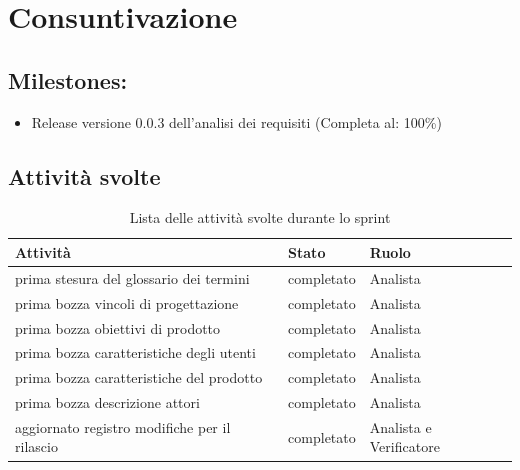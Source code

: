 \section{Consuntivazione}

\subsection{Milestones:}
\begin{itemize}
    \item Release versione 0.0.3 dell'analisi dei requisiti (Completa al: 100\%)
\end{itemize}

\subsection{Attività svolte}


\begin{table}[ht]
    \begin{tabularx}{\textwidth}{X l l}
        
        \rowcolor{gray!30} \textbf{Attività} & \textbf{Stato} & \textbf{Ruolo}\\
        
        \hline
        prima stesura del glossario dei termini & completato & Analista\\
        prima bozza vincoli di progettazione & completato & Analista\\
        prima bozza obiettivi di prodotto & completato & Analista\\
        prima bozza caratteristiche degli utenti & completato & Analista\\
        prima bozza caratteristiche del prodotto & completato & Analista\\
        prima bozza descrizione attori & completato & Analista\\
        aggiornato registro modifiche per il rilascio & completato & Analista e Verificatore\\
    \end{tabularx}
    \caption{Lista delle attività svolte durante lo sprint}
\end{table}


